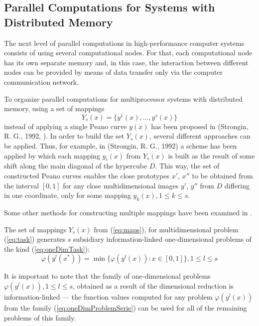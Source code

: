\documentclass{gOMS2e}
\theoremstyle{plain}%
\theoremstyle{definition}
\theoremstyle{remark}
\begin{document}
\subsection{Parallel Computations for Systems with Distributed Memory}
\label{subsec:distribpar}
The next level of parallel computations in high-performance computer systems consists of
using several computational nodes. For that, each computational node has its own separate
memory and, in this case, the interaction between different nodes can be provided by
means of data transfer only via the computer communication network.
\par
To organize parallel computations for multiprocessor systems with distributed memory, using a set of mappings
\begin{equation}
  \label{eq:maps}
Y_s(x)=\{y^1(x),\dots,y^s(x)\}
\end{equation}
instead of applying a single Peano curve \(y(x)\) has been proposed in (Strongin, R. G., 1992, \cite{strSergGO}).
In order to build the set \(Y_s(x)\), several different approaches can be applied.
Thus, for example, in (Strongin, R. G., 1992) a scheme has been applied by which each
mapping \(y_i(x)\) from \(Y_s(x)\) is built as the result of some shift along the main
diagonal of the hypercube \(D\). This way, the set of constructed Peano curves enables the
close prototypes \(x'\), \(x''\)  to be obtained from the interval \([0,1]\) for any close
multidimensional images \(y'\), \(y''\) from \(D\) differing in one coordinate,
only for some mapping \(y_k(x), 1\leqslant k\leqslant s\).
\par
Some other methods for constructing multiple mappings have been examined in \cite{stronginGergelBarkalovParGO}.
\par
The set of mappings \(Y_s(x)\) from (\ref{eq:maps}), for multidimensional problem (\ref{eq:task})
generates \(s\) subsidiary information-linked one-dimensional problems of the kind (\ref{eq:oneDimTask}):
\begin{equation}
  \label{eq:oneDimProblemSerie}
  \varphi(y^l(x^*))=\min\{\varphi(y^l(x)):x\in [0,1]\},1\leqslant l\leqslant s
\end{equation}
\par
It is important to note that the family of one-dimensional problems \(\varphi(y^l(x)),1\leqslant l\leqslant s\),
obtained as a result of the dimensional reduction is information-linked --- the function
values computed for any problem \(\varphi(y^l(x))\) from the family (\ref{eq:oneDimProblemSerie}) can be used for all
of the remaining problems of this family.
\end{document}
